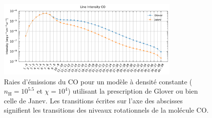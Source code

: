 \begin{appendices}
 \begin{figure}[!p]
    \centering
    \includegraphics[trim = {0 0 0 1cm },clip,width=0.8\textwidth]{figure/H2/bosse_dcte_janevVSglover/I_comp_CO.pdf}
    \caption{Raies d'émissions du $\mathrm{CO}$ pour un modèle à densité constante ($n_\mathrm{H} = 10^{5.5}$ et $\chi = 10^4$) utilisant la prescription de Glover ou bien celle de Janev. Les transitions écrites sur l'axe des abscisses signifient les transitions des niveaux rotationnels de la molécule $\mathrm{CO}$.}
    \label{fig:H2:bosse:ICO}
\end{figure}

\end{appendices}
